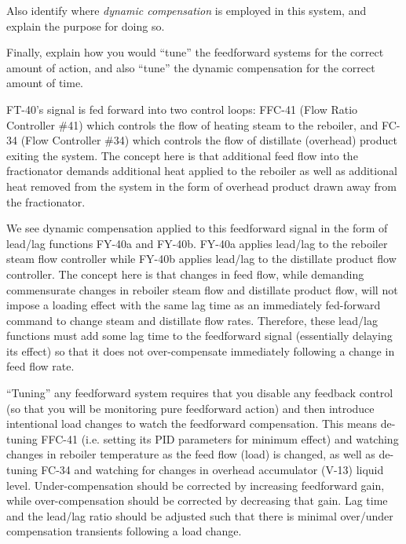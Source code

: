 \vskip 10pt

Also identify where {\it dynamic compensation} is employed in this system, and explain the purpose for doing so.

\vskip 10pt

Finally, explain how you would ``tune'' the feedforward systems for the correct amount of action, and also ``tune'' the dynamic compensation for the correct amount of time.







FT-40's signal is fed forward into two control loops: FFC-41 (Flow Ratio Controller \#41) which controls the flow of heating steam to the reboiler, and FC-34 (Flow Controller \#34) which controls the flow of distillate (overhead) product exiting the system.  The concept here is that additional feed flow into the fractionator demands additional heat applied to the reboiler as well as additional heat removed from the system in the form of overhead product drawn away from the fractionator.

\vskip 10pt

We see dynamic compensation applied to this feedforward signal in the form of lead/lag functions FY-40a and FY-40b.  FY-40a applies lead/lag to the reboiler steam flow controller while FY-40b applies lead/lag to the distillate product flow controller.  The concept here is that changes in feed flow, while demanding commensurate changes in reboiler steam flow and distillate product flow, will not impose a loading effect with the same lag time as an immediately fed-forward command to change steam and distillate flow rates.  Therefore, these lead/lag functions must add some lag time to the feedforward signal (essentially delaying its effect) so that it does not over-compensate immediately following a change in feed flow rate.

\vskip 10pt

``Tuning'' any feedforward system requires that you disable any feedback control (so that you will be monitoring pure feedforward action) and then introduce intentional load changes to watch the feedforward compensation.  This means de-tuning FFC-41 (i.e. setting its PID parameters for minimum effect) and watching changes in reboiler temperature as the feed flow (load) is changed, as well as de-tuning FC-34 and watching for changes in overhead accumulator (V-13) liquid level.  Under-compensation should be corrected by increasing feedforward gain, while over-compensation should be corrected by decreasing that gain.  Lag time and the lead/lag ratio should be adjusted such that there is minimal over/under compensation transients following a load change.

